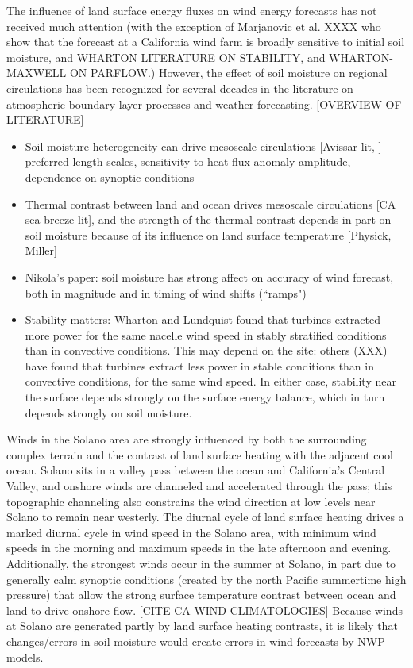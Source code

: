 The influence of land surface energy fluxes on wind energy forecasts has not received much attention (with the exception of Marjanovic et al. XXXX who show that the forecast at a California wind farm is broadly sensitive to initial soil moisture, and WHARTON LITERATURE ON STABILITY, and WHARTON-MAXWELL ON PARFLOW.)  However, the effect of soil moisture on regional circulations has been recognized for several decades in the literature on atmospheric boundary layer processes and weather forecasting.  [OVERVIEW OF LITERATURE]
\begin{itemize}
\item Soil moisture heterogeneity can drive mesoscale circulations [Avissar lit, ] - preferred length scales, sensitivity to heat flux anomaly amplitude, dependence on synoptic conditions
\item Thermal contrast between land and ocean drives mesoscale circulations [CA sea breeze lit], and the strength of the thermal contrast depends in part on soil moisture because of its influence on land surface temperature [Physick, Miller]
\item Nikola's paper: soil moisture has strong affect on accuracy of wind forecast, both in magnitude and in timing of wind shifts (``ramps")
\item Stability matters: Wharton and Lundquist found that turbines extracted more power for the same nacelle wind speed in stably stratified conditions than in convective conditions.  This may depend on the site: others (XXX) have found that turbines extract less power in stable conditions than in convective conditions, for the same wind speed.  In either case, stability near the surface depends strongly on the surface energy balance, which in turn depends strongly on soil moisture.
\end{itemize}

Winds in the Solano area are strongly influenced by both the surrounding complex terrain and the contrast of land surface heating with the adjacent cool ocean.  Solano sits in a valley pass between the ocean and California's Central Valley, and onshore winds are channeled and accelerated through the pass; this topographic channeling also constrains the wind direction at low levels near Solano to remain near westerly.  The diurnal cycle of land surface heating drives a marked diurnal cycle in wind speed in the Solano area, with minimum wind speeds in the morning and maximum speeds in the late afternoon and evening.  Additionally, the strongest winds occur in the summer at Solano, in part due to generally calm synoptic conditions (created by the north Pacific summertime high pressure) that allow the strong surface temperature contrast between ocean and land to drive onshore flow. [CITE CA WIND CLIMATOLOGIES]  Because winds at Solano are generated partly by land surface heating contrasts, it is likely that changes/errors in soil moisture would create errors in wind forecasts by NWP models.

